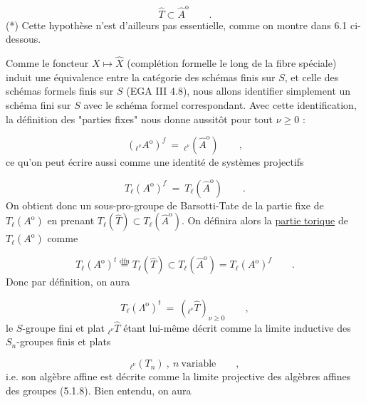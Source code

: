 \begin{equation}\tag{5.1.3}
\hat{T} \subset \hat{A}^{\mathrm{o}} \qquad .
\end{equation}
(*) Cette hypothèse n'est d'ailleurs pas essentielle, comme on montre dans 6.1 ci-dessous.



Comme le foncteur $X \longmapsto \hat{X}$ (complétion formelle le long de la fibre spéciale) induit une équivalence entre la catégorie des schémas finis sur $S$, et celle des schémas formels finis sur $S$ (EGA III 4.8), nous allons identifier simplement un schéma fini sur $S$ avec le schéma formel correspondant. Avec cette identification, la définition des "parties fixes" nous donne aussitôt pour tout $\nu \geq 0$ :

\begin{equation}\tag{5.1.4}
({}_{\ell^\nu}A^{\mathrm{o}})^f \ = \ {}_{\ell^\nu}(\hat{A}^{\mathrm{o}}) \qquad ,
\end{equation}
ce qu'on peut écrire aussi comme une identité de systèmes projectifs

\begin{equation}\tag{5.1.5}
T_\ell(A^{\mathrm{o}})^f \ = \ T_\ell(\hat{A}^{\mathrm{o}}) \qquad .
\end{equation}
On obtient donc un sous-pro-groupe de Barsotti-Tate de la partie fixe de $T_\ell(A^{\mathrm{o}})$ en prenant $T_\ell(\hat{T}) \subset T_\ell(\hat{A}^{\mathrm{o}})$. On définira alors la \underline{partie torique} de $T_\ell(A^{\mathrm{o}})$ comme

\begin{equation}\tag{5.1.6}
T_\ell(A^{\mathrm{o}})^t \stackrel{\mathrm{dfn}}{=} T_\ell(\hat{T}) \subset T_\ell(\hat{A}^{\mathrm{o}}) = T_\ell(A^{\mathrm{o}})^f \qquad .
\end{equation}
Donc par définition, on aura

\begin{equation}\tag{5.1.7}
T_\ell(\Lambda^{\mathrm{o}})^t \ = \ ({}_{\ell^\nu}\hat{T})_{\nu \geq 0} \qquad ,
\end{equation}
le $S$-groupe fini et plat ${}_{\ell^\nu}\hat{T}$ étant lui-même décrit comme la limite inductive des $S_n$-groupes finis et plats

\begin{equation}\tag{5.1.8}
{}_{\ell^\nu}(T_n) \ , \ n \ \mbox{variable} \qquad ,
\end{equation}
i.e. son algèbre affine est décrite comme la limite projective des algèbres affines des groupes (5.1.8). Bien entendu, on aura

